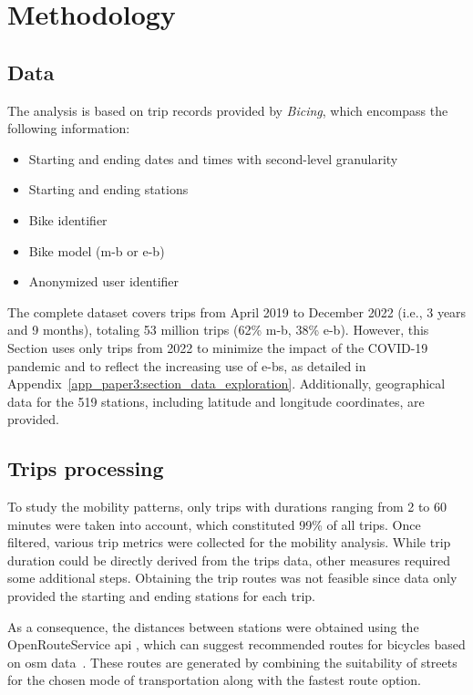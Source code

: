 \section{Methodology}

        \subsection{Data}

    The analysis is based on trip records provided by \textit{Bicing}, which encompass the following information:

    \begin{itemize}
            \item Starting and ending dates and times with second-level granularity
            \item Starting and ending stations
            \item Bike identifier
            \item Bike model (\ac{m-b} or \ac{e-b})
            \item Anonymized user identifier
    \end{itemize}

    The complete dataset covers trips from April 2019 to December 2022 (i.e., 3 years and 9 months), totaling 53 million trips (62\% \ac{m-b}, 38\% \ac{e-b}). However, this Section uses only trips from 2022 to minimize the impact of the COVID-19 pandemic and to reflect the increasing use of \acp{e-b}, as detailed in Appendix~\ref{app_paper3:section_data_exploration}. Additionally, geographical data for the 519 stations, including latitude and longitude coordinates, are provided. 

    
    \subsection{Trips processing} \label{section_trips_processing}
  
    To study the mobility patterns, only trips with durations ranging from 2 to 60 minutes were taken into account, which constituted 99\% of all trips. Once filtered, various trip metrics were collected for the mobility analysis. While trip duration could be directly derived from the trips data, other measures required some additional steps. Obtaining the trip routes was not feasible since data only provided the starting and ending stations for each trip.

    As a consequence, the distances between stations were obtained using the OpenRouteService \ac{api} \cite{OpenRouteService_2023}, which can suggest recommended routes for bicycles based on \ac{osm} data~\cite{OpenStreetMap_2023}. These routes are generated by combining the suitability of streets for the chosen mode of transportation along with the fastest route option. 

